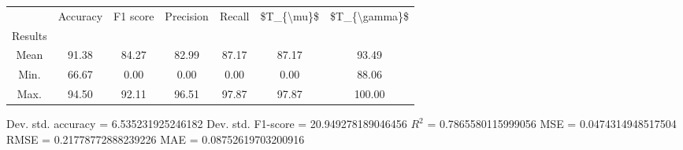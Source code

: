 \begin{tabular}{|c|c|c|c|c|c|c|}
\toprule
{} &  Accuracy &  F1 score &  Precision &  Recall &  \$T\_\{\textbackslash mu\}\$ &  \$T\_\{\textbackslash gamma\}\$ \\
Results &           &           &            &         &            &               \\
\hline
Mean    &     91.38 &     84.27 &      82.99 &   87.17 &      87.17 &         93.49 \\
Min.    &     66.67 &      0.00 &       0.00 &    0.00 &       0.00 &         88.06 \\
Max.    &     94.50 &     92.11 &      96.51 &   97.87 &      97.87 &        100.00 \\
\bottomrule
\end{tabular}

 Dev. std. accuracy = 6.535231925246182
 Dev. std. F1-score = 20.949278189046456
 $R^2$ = 0.7865580115999056
 MSE = 0.0474314948517504
 RMSE = 0.21778772888239226
 MAE = 0.08752619703200916